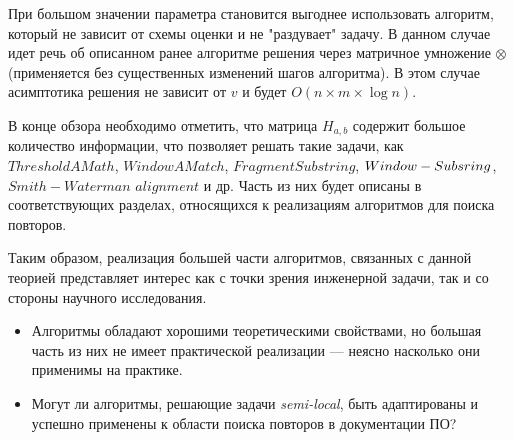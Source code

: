 При большом значении параметра становится выгоднее использовать алгоритм, который не зависит от схемы оценки и не "раздувает" задачу. 
В данном случае идет речь об описанном ранее алгоритме решения через матричное умножение $\otimes$ (применяется без существенных изменений шагов алгоритма). 
В этом случае асимптотика решения не зависит от $v$ и будет $O(  n \times m \times \log n)$.



\vspace{10 mm}В конце обзора необходимо отметить, что матрица $H_{a,b}$ содержит большое количество информации, что позволяет решать такие задачи, как $ThresholdAMath$, $WindowAMatch$, $FragmentSubstring$, $Window-\\Subsring$, $Smith-Waterman$  $alignment$ и др.
Часть из них будет описаны в соответствующих разделах, относящихся к реализациям алгоритмов для поиска повторов.

Таким образом, реализация большей части алгоритмов, связанных с данной теорией представляет интерес как с точки зрения инженерной задачи, так и со стороны научного исследования.
\begin{itemize}
    \item Алгоритмы обладают хорошими  теоретическими свойствами, но большая часть из них не имеет практической реализации --- неясно насколько они применимы на практике.
    \item Могут ли алгоритмы, решающие задачи \emph{semi-local}, быть адаптированы и успешно применены к области поиска повторов в документации ПО?
\end{itemize}


